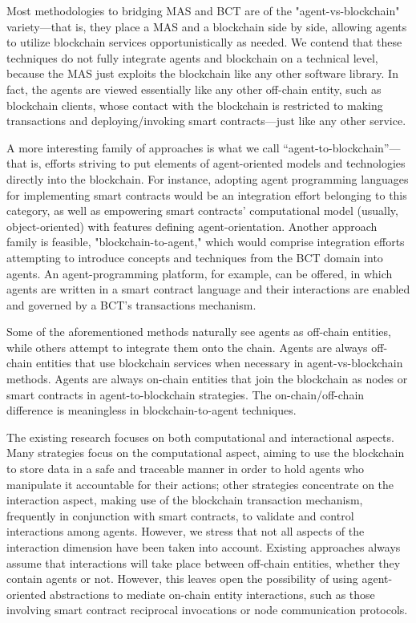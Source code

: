 Most methodologies to bridging \ac{MAS} and \ac{BCT} are of the "agent-vs-blockchain" variety—that is, they place a \ac{MAS} and a blockchain side by side, allowing agents to utilize blockchain services opportunistically as needed. We contend that these techniques do not fully integrate agents and blockchain on a technical level, because the \ac{MAS} just exploits the blockchain like any other software library. In fact, the agents are viewed essentially like any other off-chain entity, such as blockchain clients, whose contact with the blockchain is restricted to making transactions and deploying/invoking smart contracts—just like any other service.

\vspace{.5cm}

A more interesting family of approaches is what we call “agent-to-blockchain”—that is, efforts
striving to put elements of agent-oriented models and technologies directly into the blockchain.
For instance, adopting agent programming languages for implementing smart contracts would be an
integration effort belonging to this category, as well as empowering smart contracts’ computational
model (usually, object-oriented) with features defining agent-orientation. Another approach family is feasible, "blockchain-to-agent," which would comprise integration efforts attempting to introduce concepts and techniques from the \ac{BCT} domain into agents. An agent-programming platform, for example, can be offered, in which agents are written in a smart contract language and their interactions are enabled and governed by a \ac{BCT}'s transactions mechanism.

\vspace{.5cm}

Some of the aforementioned methods naturally see agents as off-chain entities, while others attempt to integrate them onto the chain. Agents are always off-chain entities that use blockchain services when necessary in agent-vs-blockchain methods. Agents are always on-chain entities that join the blockchain as nodes or smart contracts in agent-to-blockchain strategies. The on-chain/off-chain difference is meaningless in blockchain-to-agent techniques.

\vspace{.5cm}

The existing research focuses on both computational and interactional aspects. Many strategies focus on the computational aspect, aiming to use the blockchain to store data in a safe and traceable manner in order to hold agents who manipulate it accountable for their actions; other strategies concentrate on the interaction aspect, making use of the blockchain transaction mechanism, frequently in conjunction with smart contracts, to validate and control interactions among agents. However, we stress that not all aspects of the interaction dimension have been taken into account. Existing approaches always assume that interactions will take place between off-chain entities, whether they contain agents or not. However, this leaves open the possibility of using agent-oriented abstractions to mediate on-chain entity interactions, such as those involving smart contract reciprocal invocations or node communication protocols.


